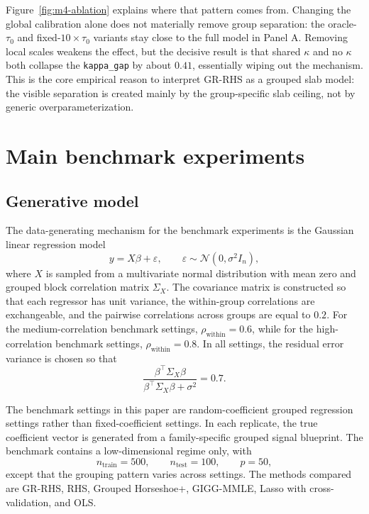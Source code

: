 \documentclass[11pt]{article}
\newcommand{\Norm}{\mathcal{N}}
\begin{document}
Figure~\ref{fig:m4-ablation} explains where that pattern comes from. Changing
the global calibration alone does not materially remove group separation: the
oracle-\(\tau_0\) and fixed-\(10\times\tau_0\) variants stay close to the full
model in Panel A. Removing local scales weakens the effect, but the decisive
result is that shared \(\kappa\) and no \(\kappa\) both collapse the
\texttt{kappa\_gap} by about \(0.41\), essentially wiping out the mechanism.
This is the core empirical reason to interpret GR-RHS as a grouped slab model:
the visible separation is created mainly by the group-specific slab ceiling,
not by generic overparameterization.

\section{Main benchmark experiments}

\subsection{Generative model}

The data-generating mechanism for the benchmark experiments is the Gaussian
linear regression model
\[
  y = X\beta + \varepsilon,
  \qquad
  \varepsilon \sim \Norm(0,\sigma^2 I_n),
\]
where \(X\) is sampled from a multivariate normal distribution with mean zero
and grouped block correlation matrix \(\Sigma_X\). The covariance matrix is
constructed so that each regressor has unit variance, the within-group
correlations are exchangeable, and the pairwise correlations across groups are
equal to \(0.2\). For the medium-correlation benchmark settings,
\(\rho_{\mathrm{within}}=0.6\), while for the high-correlation benchmark
settings, \(\rho_{\mathrm{within}}=0.8\). In all settings, the residual error
variance is chosen so that
\[
  \frac{\beta^\top \Sigma_X \beta}{\beta^\top \Sigma_X \beta + \sigma^2}=0.7.
\]

The benchmark settings in this paper are random-coefficient grouped regression
settings rather than fixed-coefficient settings. In each replicate, the true
coefficient vector is generated from a family-specific grouped signal blueprint.
The benchmark contains a low-dimensional regime only, with
\[
  n_{\mathrm{train}}=500,\qquad n_{\mathrm{test}}=100,\qquad p=50,
\]
except that the grouping pattern varies across settings. The methods compared
are GR-RHS, RHS, Grouped Horseshoe+, GIGG-MMLE, Lasso with cross-validation,
and OLS.
\end{document}
